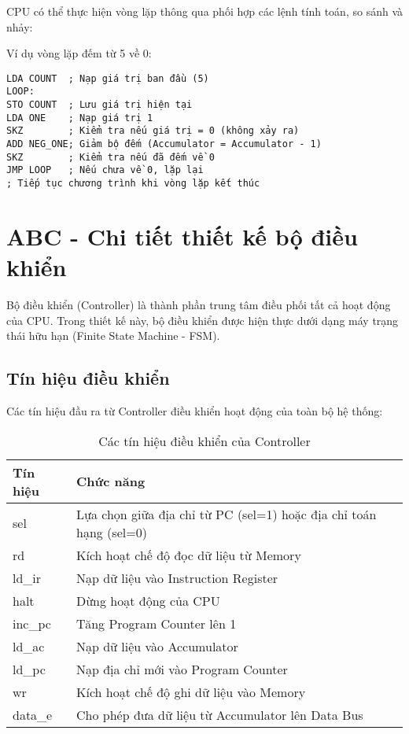 CPU có thể thực hiện vòng lặp thông qua phối hợp các lệnh tính toán, so sánh và nhảy:

Ví dụ vòng lặp đếm từ 5 về 0:
\begin{verbatim}
LDA COUNT  ; Nạp giá trị ban đầu (5)
LOOP:
STO COUNT  ; Lưu giá trị hiện tại
LDA ONE    ; Nạp giá trị 1
SKZ        ; Kiểm tra nếu giá trị = 0 (không xảy ra)
ADD NEG_ONE; Giảm bộ đếm (Accumulator = Accumulator - 1)
SKZ        ; Kiểm tra nếu đã đếm về 0
JMP LOOP   ; Nếu chưa về 0, lặp lại
; Tiếp tục chương trình khi vòng lặp kết thúc
\end{verbatim}

\section{ABC - Chi tiết thiết kế bộ điều khiển}

Bộ điều khiển (Controller) là thành phần trung tâm điều phối tất cả hoạt động của CPU. Trong thiết kế này, bộ điều khiển được hiện thực dưới dạng máy trạng thái hữu hạn (Finite State Machine - FSM).

\subsection{Tín hiệu điều khiển}

Các tín hiệu đầu ra từ Controller điều khiển hoạt động của toàn bộ hệ thống:

\begin{table}[h]
\centering
\begin{tabular}{|l|l|}
\hline
\textbf{Tín hiệu} & \textbf{Chức năng} \\
\hline
sel & Lựa chọn giữa địa chỉ từ PC (sel=1) hoặc địa chỉ toán hạng (sel=0) \\
\hline
rd & Kích hoạt chế độ đọc dữ liệu từ Memory \\
\hline
ld\_ir & Nạp dữ liệu vào Instruction Register \\
\hline
halt & Dừng hoạt động của CPU \\
\hline
inc\_pc & Tăng Program Counter lên 1 \\
\hline
ld\_ac & Nạp dữ liệu vào Accumulator \\
\hline
ld\_pc & Nạp địa chỉ mới vào Program Counter \\
\hline
wr & Kích hoạt chế độ ghi dữ liệu vào Memory \\
\hline
data\_e & Cho phép đưa dữ liệu từ Accumulator lên Data Bus \\
\hline
\end{tabular}
\caption{Các tín hiệu điều khiển của Controller}
\label{tab:control_signals}
\end{table}

